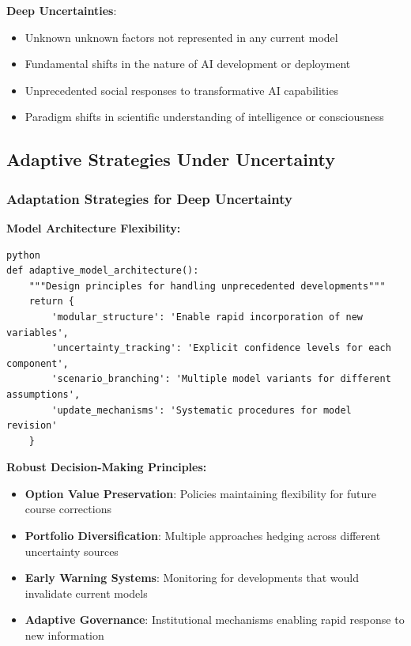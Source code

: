 \documentclass[
  11pt,
  letterpaper,
]{book}
\providecommand{\tightlist}{%
  \setlength{\itemsep}{0pt}\setlength{\parskip}{0pt}}
\begin{document}
\textbf{Deep Uncertainties}:

\begin{itemize}
\tightlist
\item
  Unknown unknown factors not represented in any current model
\item
  Fundamental shifts in the nature of AI development or deployment
\item
  Unprecedented social responses to transformative AI capabilities
\item
  Paradigm shifts in scientific understanding of intelligence or
  consciousness
\end{itemize}

\subsection{Adaptive Strategies Under
Uncertainty}\label{sec-adaptive-strategies}

\subsubsection{Adaptation Strategies for Deep
Uncertainty}\label{sec-adaptation-strategies}

\textbf{Model Architecture Flexibility:}

\begin{verbatim}
python
def adaptive_model_architecture():
    """Design principles for handling unprecedented developments"""
    return {
        'modular_structure': 'Enable rapid incorporation of new variables',
        'uncertainty_tracking': 'Explicit confidence levels for each component',
        'scenario_branching': 'Multiple model variants for different assumptions',
        'update_mechanisms': 'Systematic procedures for model revision'
    }
\end{verbatim}

\textbf{Robust Decision-Making Principles:}

\begin{itemize}
\tightlist
\item
  \textbf{Option Value Preservation}: Policies maintaining flexibility
  for future course corrections
\item
  \textbf{Portfolio Diversification}: Multiple approaches hedging across
  different uncertainty sources
\item
  \textbf{Early Warning Systems}: Monitoring for developments that would
  invalidate current models
\item
  \textbf{Adaptive Governance}: Institutional mechanisms enabling rapid
  response to new information
\end{itemize}
\end{document}
